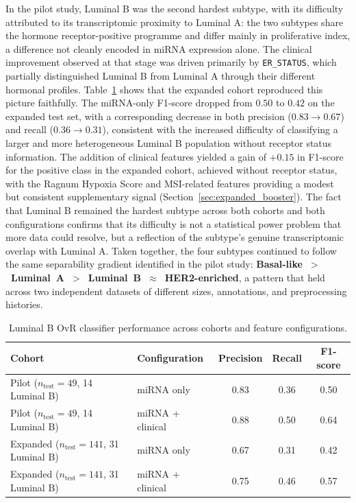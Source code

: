 In the pilot study, Luminal B was the second hardest subtype, with its difficulty
attributed to its transcriptomic proximity to Luminal A: the two subtypes share the
hormone receptor-positive programme and differ mainly in proliferative index, a
difference not cleanly encoded in miRNA expression alone. The clinical
improvement observed at that stage was driven primarily by \texttt{ER\_STATUS},
which partially distinguished Luminal B from Luminal A through their different
hormonal profiles. Table~\ref{tab:lumB_expanded} shows that the expanded cohort
reproduced this picture faithfully. The miRNA-only F1-score dropped from $0.50$
to $0.42$ on the expanded test set, with a corresponding decrease in both precision
($0.83 \to 0.67$) and recall ($0.36 \to 0.31$), consistent with the increased
difficulty of classifying a larger and more heterogeneous Luminal B population
without receptor status information. The addition of clinical features yielded a
gain of $+0.15$ in F1-score for the positive class in the expanded cohort, achieved
without receptor status, with the Ragnum Hypoxia Score and MSI-related features
providing a modest but consistent supplementary signal
(Section~\ref{sec:expanded_booster}). The fact that Luminal B remained the hardest
subtype across both cohorts and both configurations confirms that its difficulty is
not a statistical power problem that more data could resolve, but a reflection of the
subtype's genuine transcriptomic overlap with Luminal A. Taken together, the four
subtypes continued to follow the same separability gradient identified in the pilot
study: \textbf{Basal-like~$>$~Luminal~A~$>$~Luminal~B~$\approx$~HER2-enriched},
a pattern that held across two independent datasets of different sizes, annotations,
and preprocessing histories.

\begin{table}[!ht]
    \centering
    \caption{Luminal B OvR classifier performance across cohorts and feature configurations.}
    \label{tab:lumB_expanded}
    \begin{tabular}{llccc}
    \toprule
    \textbf{Cohort} & \textbf{Configuration} & \textbf{Precision} & \textbf{Recall} & \textbf{F1-score} \\
    \midrule
    Pilot ($n_{\text{test}}=49$, 14 Luminal B)      & miRNA only         & 0.83 & 0.36 & 0.50 \\
    Pilot ($n_{\text{test}}=49$, 14 Luminal B)      & miRNA + clinical   & 0.88  & 0.50  & 0.64  \\
    \midrule
    Expanded ($n_{\text{test}}=141$, 31 Luminal B) & miRNA only         & 0.67 & 0.31 & 0.42 \\
    Expanded ($n_{\text{test}}=141$, 31 Luminal B) & miRNA + clinical   & 0.75 & 0.46 & 0.57 \\
    \bottomrule
    \end{tabular}
    \end{table}

